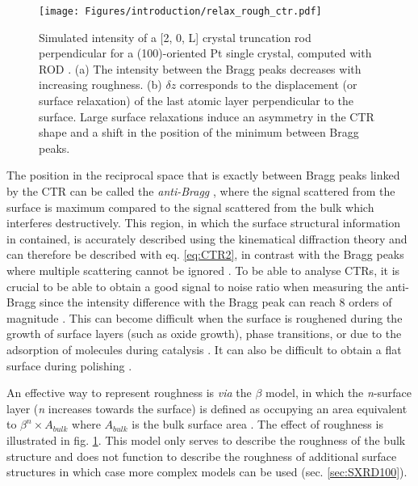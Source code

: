 \begin{figure}[!htb]
    \centering
    \texttt{[image: Figures/introduction/relax\_rough\_ctr.pdf]}
    \caption{
    Simulated intensity of a [2, 0, L] crystal truncation rod perpendicular for a (100)-oriented Pt single crystal, computed with ROD \parencite{Vlieg2000}.
    (a) The intensity between the Bragg peaks decreases with increasing roughness.
    (b) $\delta z$ corresponds to the displacement (or surface relaxation) of the last atomic layer perpendicular to the surface.
    Large surface relaxations induce an asymmetry in the CTR shape and a shift in the position of the minimum between Bragg peaks.
    }
    \label{fig:CTRSimulation}
\end{figure}

The position in the reciprocal space that is exactly between Bragg peaks linked by the CTR can be called the \textit{anti-Bragg} \parencite{Robinson1991}, where the signal scattered from the surface is maximum compared to the signal scattered from the bulk which interferes destructively.
This region, in which the surface structural information in contained, is accurately described using the kinematical diffraction theory and can therefore be described with eq. \ref{eq:CTR2}, in contrast with the Bragg peaks where multiple scattering cannot be ignored \parencite{Kaganer2007}.
To be able to analyse CTRs, it is crucial to be able to obtain a good signal to noise ratio when measuring the anti-Bragg since the intensity difference with the Bragg peak can reach 8 orders of magnitude \parencite{Fadenberger2010}.
This can become difficult when the surface is roughened during the growth of surface layers (such as oxide growth), phase transitions, or due to the adsorption of molecules during catalysis \parencite{Zhdanov1997, Zhdanov1998}.
It can also be difficult to obtain a flat surface during polishing \parencite{Musket1982}.

An effective way to represent roughness is \textit{via} the $\beta$ model, in which the \textit{n}-surface layer (\textit{n} increases towards the surface) is defined as occupying an area equivalent to $\beta^n \times A_{bulk}$ where $A_{bulk}$ is the bulk surface area \parencite{Robinson1986}.
The effect of roughness is illustrated in fig. \ref{fig:CTRSimulation}.
This model only serves to describe the roughness of the bulk structure and does not function to describe the roughness of additional surface structures in which case more complex models can be used (sec. \ref{sec:SXRD100}).

